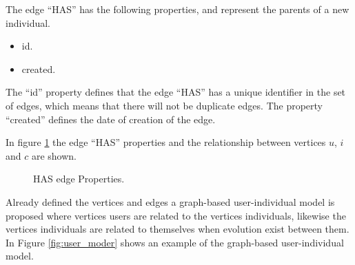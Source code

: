 The edge “HAS” has the following properties, and represent the parents of a new individual.
\begin{itemize}
\item id.
\item created.
\end{itemize}

The “id” property defines that the edge “HAS” has a unique identifier in the set
of edges, which means that there will not be duplicate edges. The property
“created” defines the date of creation of the edge.

In figure \ref{fig:Has_edge} the edge “HAS” properties and the relationship
between vertices $u$, $i$ and $c$ are shown.

\begin{figure}
\captionsetup{justification=centering,margin=2cm}
\centering
\setlength\fboxsep{0pt}
\setlength\fboxrule{0.7pt}
\caption{HAS edge Properties.}
\label{fig:Has_edge}
\end{figure}


Already defined the vertices and edges a graph-based user-individual model is
proposed where vertices users are related to the vertices individuals, likewise
the vertices individuals are related to themselves when evolution exist between
them. In Figure \ref{fig:user_moder} shows an example of the graph-based
user-individual model.

